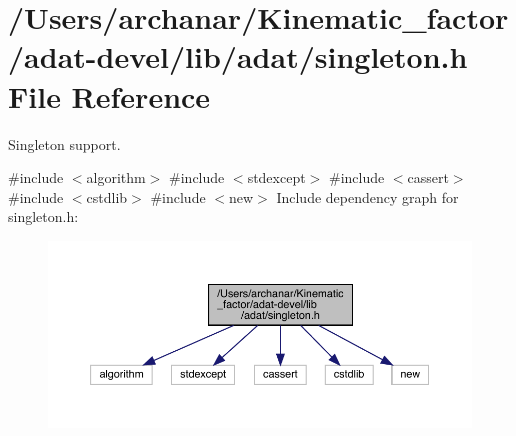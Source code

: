 \hypertarget{adat-devel_2lib_2adat_2singleton_8h}{}\section{/\+Users/archanar/\+Kinematic\+\_\+factor/adat-\/devel/lib/adat/singleton.h File Reference}
\label{adat-devel_2lib_2adat_2singleton_8h}


Singleton support.  


{\ttfamily \#include $<$algorithm$>$}\newline
{\ttfamily \#include $<$stdexcept$>$}\newline
{\ttfamily \#include $<$cassert$>$}\newline
{\ttfamily \#include $<$cstdlib$>$}\newline
{\ttfamily \#include $<$new$>$}\newline
Include dependency graph for singleton.\+h\+:
\nopagebreak
\begin{figure}[H]
\begin{center}
\leavevmode
\includegraphics[width=350pt]{da/d5d/adat-devel_2lib_2adat_2singleton_8h__incl}
\end{center}
\end{figure}
